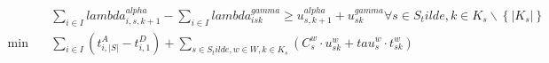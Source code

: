 \begin{align}
  & \sum_{i \in I} \mathit{lambda}_{i , s , k + 1}^{\mathit{alpha}} - \sum_{i \in I} \mathit{lambda}_{\mathit{isk}}^{\mathit{gamma}} \geq u_{s , k + 1}^{\mathit{alpha}} + u_{s k}^{\mathit{gamma}} \forall s \in S_tilde , k \in K_{s} \backslash \left\{\left|K_{s}\right|\right\} \tag{eq\_0026} \\
  \min\quad & \sum_{i \in I} \left(t_{i , \left|S\right|}^{A} - t_{i , 1}^{D}\right) + \sum_{s \in S_tilde , w \in W , k \in K_{s}} \left(C_{s}^{w} \cdot u_{\mathit{sk}}^{w} + \mathit{tau}_{s}^{w} \cdot t_{\mathit{sk}}^{w}\right) \tag{eq\_0027} \\
\end{align}
